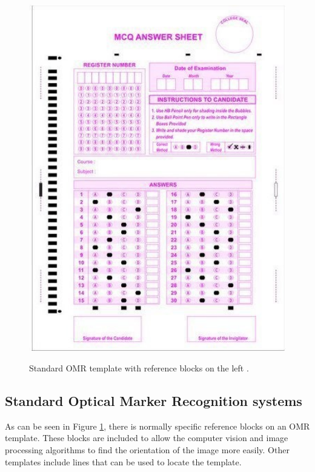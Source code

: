 \begin{figure}
  \centering
  \includegraphics[width=14cm]{omrTemplate}\\
  \caption{Standard OMR template with reference blocks on the left \citep{stdTemplate}.}
  \label{fig:omrTemplate}
\end{figure}

\subsection{Standard Optical Marker Recognition systems}
\label{sec:StandardTech}

As can be seen in Figure \ref{fig:omrTemplate}, there is normally specific reference blocks on an OMR template. These blocks are included to allow the computer vision and image processing algorithms to find the orientation of the image more easily. Other templates include lines that can be used to locate the template.

